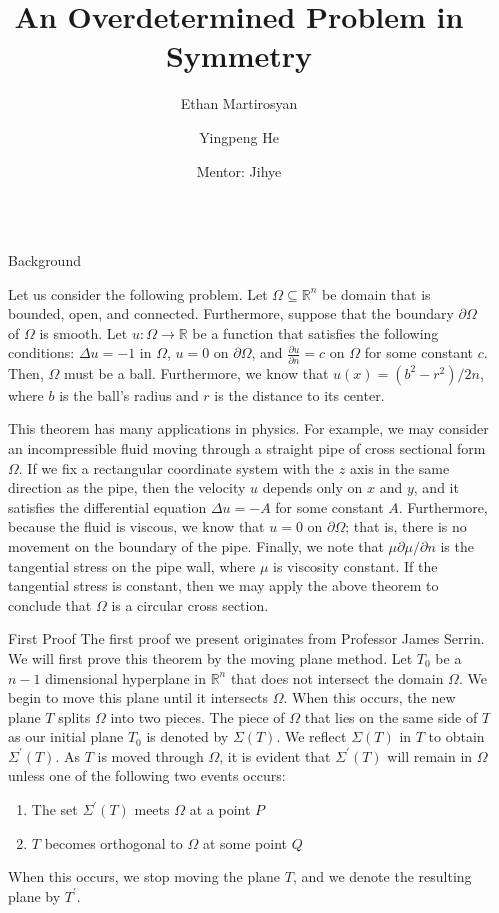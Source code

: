 \documentclass[final]{beamer}
\title{An Overdetermined Problem in Symmetry}
\author{Ethan Martirosyan \and Yingpeng He \and Mentor: Jihye}
\institute[shortinst]{University of California Santa Barbara}
\newlength{\sepwidth}
\newlength{\colwidth}
\newcommand{\separatorcolumn}{\begin{column}{\sepwidth}\end{column}}
\begin{document}
\begin{frame}[t]
\begin{columns}[t]
\separatorcolumn

\begin{column}{\colwidth}

  \begin{block}{Background}

    Let us consider the following problem. Let $\Omega \subseteq \mathbb{R}^n$ be domain that is bounded, open, and connected. Furthermore, suppose that the boundary $\partial{\Omega}$ of $\Omega$ is smooth. Let $u: \Omega \rightarrow \mathbb{R}$ be a function that satisfies the following conditions: $\Delta u = -1$ in $\Omega$, $u=0$ on $\partial{\Omega}$, and $\frac{\partial{u}}{\partial{n}} = c$ on $\Omega$ for some constant $c$. Then, $\Omega$ must be a ball. Furthermore, we know that $u(x) = (b^2-r^2)/2n$, where $b$ is the ball's radius and $r$ is the distance to its center.

  This theorem has many applications in physics. For example, we may consider an incompressible fluid moving through a straight pipe of cross sectional form $\Omega$. If we fix a rectangular coordinate system with the $z$ axis in the same direction as the pipe, then the velocity $u$ depends only on $x$ and $y$, and it satisfies the differential equation $\Delta u = -A$ for some constant $A$. Furthermore, because the fluid is viscous, we know that $u = 0$ on $\partial{\Omega}$; that is, there is no movement on the boundary of the pipe. Finally, we note that $\mu\partial{\mu}/\partial{n}$ is the tangential stress on the pipe wall, where $\mu$ is viscosity constant. If the tangential stress is constant, then we may apply the above theorem to conclude that $\Omega$ is a circular cross section.
 
  \end{block}

  \begin{block}{First Proof}
	The first proof we present originates from Professor James Serrin.
    We will first prove this theorem by the moving plane method. Let $T_0$ be a $n-1$ dimensional hyperplane in $\mathbb{R}^n$ that does not intersect the domain $\Omega$. We begin to move this plane until it intersects $\Omega$. When this occurs, the new plane $T$ splits $\Omega$ into two pieces. The piece of $\Omega$ that lies on the same side of $T$ as our initial plane $T_0$ is denoted by $\Sigma(T)$. We reflect $\Sigma(T)$ in $T$ to obtain $\Sigma^\prime(T)$. As $T$ is moved through $\Omega$, it is evident that $\Sigma^\prime(T)$ will remain in $\Omega$ unless one of the following two events occurs:
    \begin{enumerate}[]
        \item The set $\Sigma^\prime(T)$ meets $\Omega$ at a point $P$
        \item $T$ becomes orthogonal to $\Omega$ at some point $Q$
    \end{enumerate} When this occurs, we stop moving the plane $T$, and we denote the resulting plane by $T^\prime$.
    

\end{block}
\end{column}
\end{columns}
\end{frame}
\end{document}
